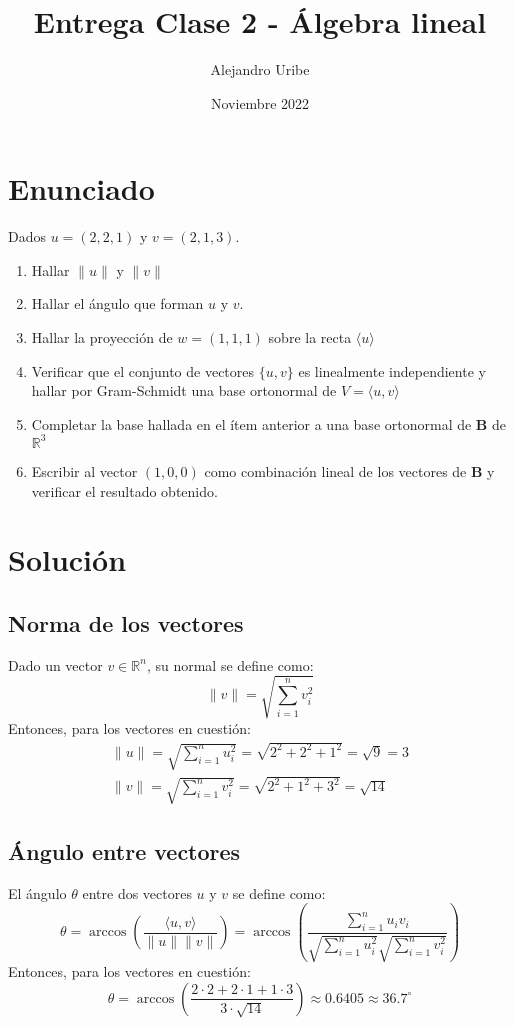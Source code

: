 \documentclass[a4paper,spanish]{article}
\title{Entrega Clase 2 - Álgebra lineal}
\author{Alejandro Uribe}
\date{Noviembre 2022}
\begin{document}
\maketitle

\section*{Enunciado}
Dados $u = (2, 2, 1)$ y $v = (2, 1, 3)$.
\begin{enumerate}
    \item Hallar $\lVert u \rVert$ y $\lVert v \rVert$
    \item Hallar el ángulo que forman $u$ y $v$.
    \item Hallar la proyección de $w = (1, 1, 1)$ sobre la recta $\langle u \rangle$
    \item Verificar que el conjunto de vectores $\{u, v\}$ es linealmente independiente y hallar por Gram-Schmidt una base ortonormal de $V = \langle u,v \rangle$
    \item Completar la base hallada en el ítem anterior a una base ortonormal de $\mathbf{B}$ de $\mathbb{R}^{3}$
    \item Escribir al vector $(1,0,0)$ como combinación lineal de los vectores de $\mathbf{B}$ y verificar el resultado obtenido.
\end{enumerate}

\section*{Solución}
\subsection*{Norma de los vectores}
Dado un vector $v  \in \mathbb{R}^{n}$, su normal se define como:
\[
    \lVert v \rVert = \sqrt{\sum_{i=1}^{n}v_{i}^2}
\]
Entonces, para los vectores en cuestión:
\begin{align*}
    \lVert u \rVert = \sqrt{\sum_{i=1}^{n}u_{i}^2} = \sqrt{ 2^2 + 2^2 + 1^2 } = \sqrt{9} = 3 \\
    \lVert v \rVert = \sqrt{\sum_{i=1}^{n}v_{i}^2} = \sqrt{ 2^2 + 1^2 + 3^2 } = \sqrt{14}
\end{align*}
\subsection*{Ángulo entre vectores}
El ángulo $\theta$ entre dos vectores $u$ y $v$ se define como:
\[
    \theta = \arccos \left(\frac{\langle u, v \rangle}{\lVert u \rVert \lVert v \rVert} \right) = \arccos \left(  \frac{\displaystyle\sum_{i=1}^{n}u_{i}v_{i}}{\sqrt{\displaystyle\sum_{i=1}^{n}u_{i}^2} \sqrt{\displaystyle\sum_{i=1}^{n}v_{i}^2}}  \right)
\]
Entonces, para los vectores en cuestión:
\[
    \theta = \arccos \left( \frac{2 \cdot 2 + 2 \cdot 1 + 1 \cdot 3}{3 \cdot \sqrt{14}}\right)  \approx 0.6405 \approx 36.7^{\circ}
\]
\end{document}

